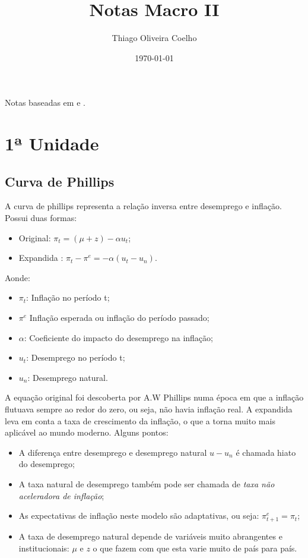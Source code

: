 \documentclass[12pt,a4paper,oneside,brazil]{abntex2}
\title{Notas Macro II}
\author{Thiago Oliveira Coelho}
\date{\today}
\begin{document}
\pagestyle{headings}
\maketitle

\begin{center}
Notas baseadas em \cite{blanchard} e \cite{rudiger}.
\end{center}

\tableofcontents

\chapter{1ª Unidade}

\section{Curva de Phillips}
A curva de phillips representa a relação inversa entre desemprego e inflação.
Possui duas formas:
\begin{itemize}
\item Original: $\pi_t = (\mu + z) - \alpha u_t$;
\item Expandida : $\pi_t - \pi^e  =  - \alpha (u_t - u_n)$.
\end{itemize}
Aonde: \begin{itemize}
\item  $\pi_t$: Inflação no período t;
\item $\pi^e$ Inflação esperada ou inflação do período passado;
\item $\alpha$: Coeficiente do impacto do desemprego na inflação;
\item $u_t$: Desemprego no período t;
\item $u_n$: Desemprego natural.
\end{itemize}
A equação original foi descoberta  por A.W Phillips numa época em que a inflação flutuava sempre ao redor do zero, ou seja, não havia inflação real. A expandida leva em conta a taxa de crescimento da inflação, o que a torna muito mais aplicável ao mundo moderno.
Alguns pontos:
\begin{itemize}
\item A diferença entre desemprego e desemprego natural $u - u_n$ é chamada hiato do desemprego;
\item A taxa natural de desemprego também pode ser chamada de \emph{taxa não aceleradora de inflação};
\item As expectativas de inflação neste modelo são adaptativas, ou seja: $\pi^e_{t+1} = \pi_t$;
\item A taxa de desemprego natural depende de variáveis muito abrangentes e institucionais: $\mu$ e $z$ o que fazem com que esta varie muito de país para país.
\end{itemize}
\clearpage
\end{document}
